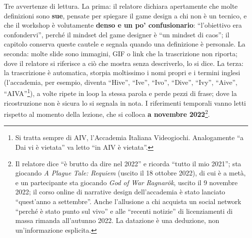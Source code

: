 Tre avvertenze di lettura. La prima: il relatore dichiara apertamente che
molte definizioni sono \textbf{sue}, pensate per spiegare il game design a chi
non è un tecnico, e che il workshop è volutamente \textbf{denso e un po'
confusionario}: ``l'obiettivo era confondervi'', perché il mindset del game
designer è ``un mindset di caos''; il capitolo conserva queste cautele e
segnala quando una definizione è personale. La seconda: molte slide sono
immagini, GIF o link che la trascrizione non riporta; dove il relatore si
riferisce a ciò che mostra senza descriverlo, lo si dice. La terza: la
trascrizione è automatica, storpia moltissimo i nomi propri e i termini
inglesi (l'accademia, per esempio, diventa ``Hive'', ``Ive'', ``Ivo'',
``Dive'', ``Ivy'', ``Aive'', ``AIVA''\footnote{Si tratta sempre di AIV,
l'Accademia Italiana Videogiochi. Analogamente ``a Dai vi è vietata'' va
letto ``in AIV è vietata''.}), a volte ripete in loop la stessa parola e perde
pezzi di frase; dove la ricostruzione non è sicura lo si segnala in nota. I
riferimenti temporali vanno letti rispetto al momento della lezione, che si
colloca \textbf{a novembre 2022}\footnote{Il relatore dice ``è brutto da dire
nel 2022'' e ricorda ``tutto il mio 2021''; sta giocando \emph{A Plague Tale:
Requiem} (uscito il 18 ottobre 2022), di cui è a metà, e un partecipante sta
giocando \emph{God of War Ragnarök}, uscito il 9 novembre 2022; il corso online
di narrative design dell'accademia è stato lanciato ``quest'anno a
settembre''. Anche l'allusione a chi acquista un social network ``perché è
stato punto sul vivo'' e alle ``recenti notizie'' di licenziamenti di massa
rimanda all'autunno 2022. La datazione è una deduzione, non un'informazione
esplicita.}.

